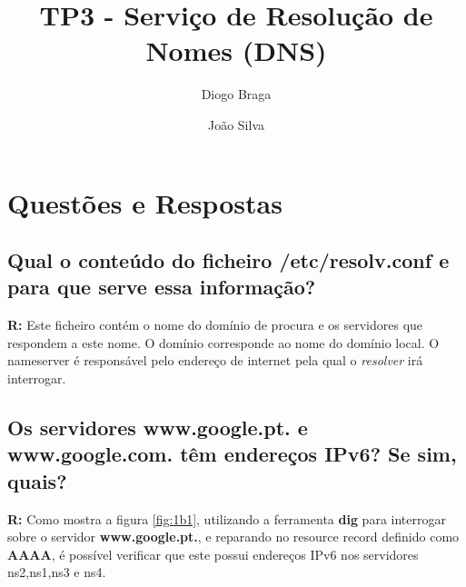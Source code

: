 \documentclass{llncs}
\begin{document}
\mainmatter
\title{TP3 - Serviço de Resolução de Nomes (DNS)}


\author{Diogo Braga \and João Silva}



\date{}


\maketitle

\section{Questões e Respostas}

\subsection{\textbf{Qual o conteúdo do ficheiro /etc/resolv.conf e para que serve essa informação?}}
\textbf{R:} Este ficheiro contém o nome do domínio de procura e os servidores que respondem a este nome. O domínio corresponde ao nome do domínio local. O nameserver é responsável pelo endereço de internet pela qual o \textit{resolver} irá interrogar.


\subsection{\textbf{Os servidores www.google.pt. e www.google.com. têm endereços IPv6? Se sim, quais?}}
\textbf{R:} Como mostra a figura \ref{fig:1b1}, utilizando a ferramenta \textbf{dig} para interrogar sobre o servidor \textbf{www.google.pt.}, e reparando no resource record definido como \textbf{AAAA}, é possível verificar que este possui endereços IPv6 nos servidores ns2,ns1,ns3 e ns4.
\end{document}
